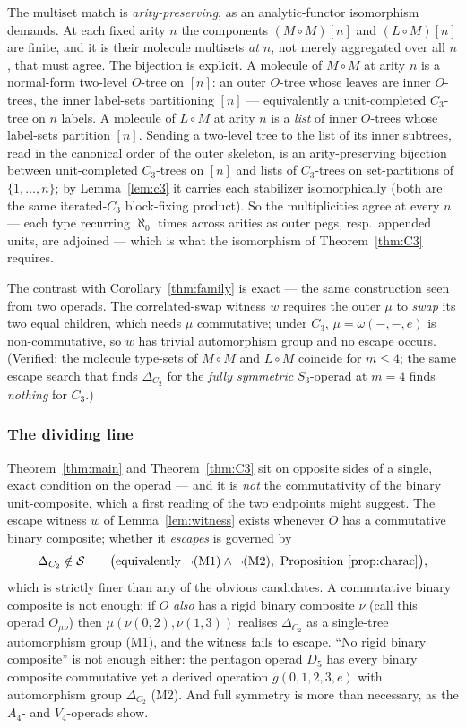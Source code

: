 \documentclass[11pt]{amsart}
\theoremstyle{plain}
\theoremstyle{definition}
\begin{document}
The multiset match is \emph{arity-preserving}, as an analytic-functor isomorphism demands. At each fixed
arity $n$ the components $(M\circ M)[n]$ and $(L\circ M)[n]$ are finite, and it is their molecule
multisets \emph{at $n$}, not merely aggregated over all $n$, that must agree. The bijection is explicit.
A molecule of $M\circ M$ at arity $n$ is a normal-form two-level $O$-tree on $[n]$: an outer $O$-tree
whose leaves are inner $O$-trees, the inner label-sets partitioning $[n]$ --- equivalently a
unit-completed $C_3$-tree on $n$ labels. A molecule of $L\circ M$ at arity $n$ is a \emph{list} of inner
$O$-trees whose label-sets partition $[n]$. Sending a two-level tree to the list of its inner subtrees,
read in the canonical order of the outer skeleton, is an arity-preserving bijection between
unit-completed $C_3$-trees on $[n]$ and lists of $C_3$-trees on set-partitions of $\{1,\dots,n\}$; by
Lemma~\ref{lem:c3} it carries each stabilizer isomorphically (both are the same iterated-$C_3$
block-fixing product). So the multiplicities agree at every $n$ --- each type recurring $\aleph_0$ times
across arities as outer pegs, resp.\ appended units, are adjoined --- which is what the isomorphism of
Theorem~\ref{thm:C3} requires.

The contrast with Corollary~\ref{thm:family} is exact --- the same construction seen from two operads. The
correlated-swap witness $w$ requires the outer $\mu$ to \emph{swap} its two equal children, which needs
$\mu$ commutative; under $C_3$, $\mu=\omega(-,-,e)$ is non-commutative, so $w$ has trivial automorphism
group and no escape occurs. (Verified: the molecule type-sets of $M\circ M$ and $L\circ M$ coincide for
$m\le4$; the same escape search that finds $\Delta_{C_2}$ for the \emph{fully symmetric} $S_3$-operad at
$m=4$ finds \emph{nothing} for $C_3$.)

\subsubsection*{The dividing line}
Theorem~\ref{thm:main} and Theorem~\ref{thm:C3} sit on opposite sides of a single, exact condition on the
operad --- and it is \emph{not} the commutativity of the binary unit-composite, which a first reading of
the two endpoints might suggest. The escape witness $w$ of Lemma~\ref{lem:witness} exists whenever $O$ has
a commutative binary composite; whether it \emph{escapes} is governed by
\[
  \Delta_{C_2}\notin\mathcal S\qquad\bigl(\text{equivalently } \neg\textup{(M1)}\wedge\neg\textup{(M2)},\
  \text{Proposition~\ref{prop:charac}}\bigr),
\]
which is strictly finer than any of the obvious candidates. A commutative binary composite is not enough:
if $O$ \emph{also} has a rigid binary composite $\nu$ (call this operad $O_{\mu\nu}$) then
$\mu(\nu(0,2),\nu(1,3))$ realises $\Delta_{C_2}$ as a single-tree automorphism group (M1), and the witness
fails to escape. ``No rigid binary composite'' is not enough either: the pentagon operad $D_5$ has every
binary composite commutative yet a derived operation $g(0,1,2,3,e)$ with automorphism group $\Delta_{C_2}$
(M2). And full symmetry is more than necessary, as the $A_4$- and $V_4$-operads show.
\end{document}
